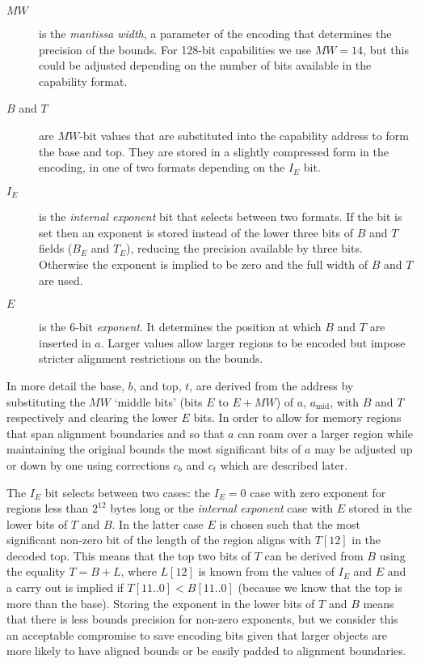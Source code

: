 \begin{description}

\item[$MW$] is the \emph{mantissa width}, a parameter of the encoding that
  determines the precision of the bounds. For 128-bit capabilities we
  use $MW = 14$, but this could be adjusted depending on
  the number of bits available in the capability format.

\item[$B$ and $T$] are $MW$-bit values that are substituted into the
  capability address to form the base and top. They are stored in a
  slightly compressed form in the encoding, in one of two formats
  depending on the $I_E$ bit.

\item[$I_E$] is the \emph{internal exponent} bit that selects between
  two formats. If the bit is set then an exponent is stored instead of
  the lower three bits of $B$ and $T$ fields ($B_E$ and $T_E$),
  reducing the precision available by three bits. Otherwise the
  exponent is implied to be zero and the full width of $B$ and $T$ are
  used.

\item[$E$] is the 6-bit \emph{exponent}. It determines the position at which
  $B$ and $T$ are inserted in $a$. Larger values allow larger regions
  to be encoded but impose stricter alignment restrictions on the
  bounds.

\end{description}

In more detail the base, $b$, and top, $t$, are derived from the
address by substituting the $MW$ `middle bits' (bits $E$ to $E + MW$)
of $a$, $a_\text{mid}$, with $B$ and $T$ respectively and clearing the
lower $E$ bits.  In order to allow for memory regions that span
alignment boundaries and so that $a$ can roam over a larger region
while maintaining the original bounds the most significant bits of
$a$ may be adjusted up or down by one using
corrections $c_b$ and $c_t$ which are described later.

The $I_E$ bit selects between two cases: the $I_E = 0$ case with zero
exponent for regions less than $2^{12}$ bytes long or the
\emph{internal exponent} case with $E$ stored in the lower bits of $T$
and $B$.  In the latter case $E$ is chosen such that the most
significant non-zero bit of the length of the region aligns
with $T[12]$ in the decoded top.  This means that the top two bits of
$T$ can be derived from $B$ using the equality $T = B + L$, where
$L[12]$ is known from the values of $I_E$ and $E$ and a carry out is
implied if $T[11..0] < B[11..0]$ (because we know that the top is more
than the base).  Storing the exponent in the lower bits of $T$ and $B$
means that there is less bounds precision for non-zero exponents, but
we consider this an acceptable compromise to save encoding bits given
that larger objects are more likely to have aligned bounds or be
easily padded to alignment boundaries.

